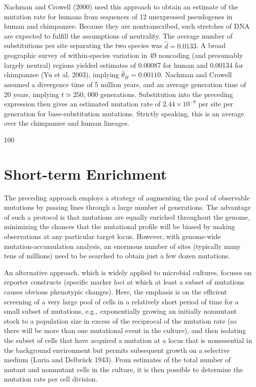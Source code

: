 \documentclass{article}
\begin{document}
Nachman and Crowell (2000) used this approach to obtain an estimate of the mutation rate for humans from sequences of 12 unexpressed pseudogenes in human and chimpanzee. Because they are nontranscribed, such stretches of DNA are expected to fulfill the assumptions of neutrality. The average number of substitutions per site separating the two species was  $ \widehat{d} = 0.0133 $. A broad geographic survey of within-species variation in 49 noncoding (and presumably largely neutral) regions yielded estimates of 0.00087 for human and 0.00134 for chimpanzee (Yu et al. 2003), implying  $ \widehat{\theta}_{H} = 0.00110 $. Nachman and Crowell assumed a divergence time of 5 million years, and an average generation time of 20 years, implying  $ t \simeq 250 $, 000 generations. Substitution into the preceding expression then gives an estimated mutation rate of  $ 2.44 \times 10^{-8} $ per site per generation for base-substitution mutations. Strictly speaking, this is an average over the chimpanzee and human lineages.

100

\section{Short-term Enrichment}
The preceding approach employs a strategy of augmenting the pool of observable mutations by passing lines through a large number of generations. The advantage of such a protocol is that mutations are equally enriched throughout the genome, minimizing the chances that the mutational profile will be biased by making observations at any particular target locus. However, with genome-wide mutation-accumulation analysis, an enormous number of sites (typically many tens of millions) need to be searched to obtain just a few dozen mutations.

An alternative approach, which is widely applied to microbial cultures, focuses on reporter constructs (specific marker loci at which at least a subset of mutations causes obvious phenotypic changes). Here, the emphasis is on the efficient screening of a very large pool of cells in a relatively short period of time for a small subset of mutations, e.g., exponentially growing an initially nonmutant stock to a population size in excess of the reciprocal of the mutation rate (so there will be more than one mutational event in the culture), and then isolating the subset of cells that have acquired a mutation at a locus that is nonessential in the background environment but permits subsequent growth on a selective medium (Luria and Delbrück 1943). From estimates of the total number of mutant and nonmutant cells in the culture, it is then possible to determine the mutation rate per cell division.
\end{document}
